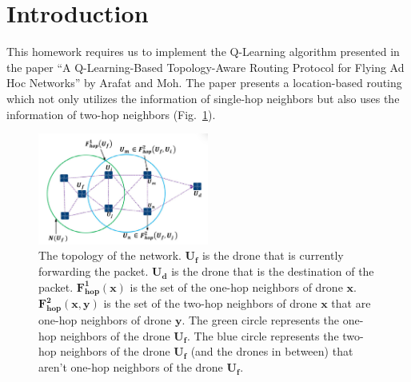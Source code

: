 \section{Introduction}
This homework requires us to implement the Q-Learning algorithm presented in
the paper ``A Q-Learning-Based Topology-Aware Routing Protocol for
Flying Ad Hoc Networks''  by Arafat and Moh.
The paper presents a location-based routing which not only utilizes
the information of single-hop neighbors but also uses the information
of two-hop neighbors (Fig.~\ref{fig:topology}).

\begin{figure}[h]
    \centering
    \includegraphics[width=0.5\textwidth]{Figures/paper-fig-6.png}
    \caption{
        The topology of the network.
        $\mathbf{U_f}$ is the drone that is currently forwarding the packet.
        $\mathbf{U_d}$ is the drone that is the destination of the packet.
        $\mathbf{F^1_{hop}(x)}$ is the set of the one-hop neighbors of drone $\mathbf{x}$.
        $\mathbf{F^2_{hop}(x, y)}$ is the set of the two-hop neighbors of drone $\mathbf{x}$ that are one-hop neighbors of drone $\mathbf{y}$.
        The green circle represents the one-hop neighbors of the drone $\mathbf{U_f}$.
        The blue circle represents the two-hop neighbors of the drone $\mathbf{U_f}$ (and the drones in between) that aren't one-hop neighbors of the drone $\mathbf{U_f}$.
    }\label{fig:topology}
\end{figure}

